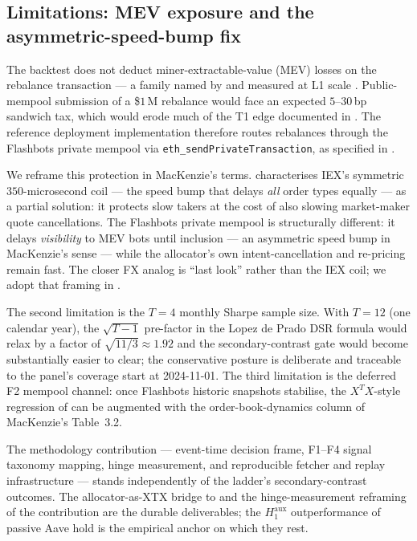 \subsection{Limitations: MEV exposure and the asymmetric-speed-bump fix}
\label{sec:disc-limits}

The backtest does not deduct miner-extractable-value (MEV) losses
on the rebalance transaction --- a family named by
\cite{daian2020flashboys} and measured at L1 scale
\cite{heimbach2023pbs, capponi2025mev}.
Public-mempool submission of a \$$1$\,M rebalance would face an
expected $5$--$30$\,bp sandwich tax, which would erode much of the
T1 edge documented in
.  The reference deployment implementation
therefore routes rebalances through the Flashbots private mempool via
\texttt{eth\_sendPrivateTransaction}, as specified in
.

We reframe this protection in MacKenzie's terms.
\cite[pp.\,200--203]{mackenzie2021} characterises IEX's symmetric
$350$-microsecond coil --- the speed bump that delays \emph{all}
order types equally --- as a partial solution: it protects slow
takers at the cost of also slowing market-maker quote
cancellations.  The Flashbots private mempool is structurally
different: it delays \emph{visibility} to MEV bots until
inclusion --- an asymmetric speed bump in MacKenzie's sense ---
while the allocator's own intent-cancellation and re-pricing
remain fast.  The closer FX analog is ``last look'' rather than
the IEX coil; we adopt that framing in
.

The second limitation is the $T = 4$ monthly Sharpe sample size.
With $T = 12$ (one calendar year), the $\sqrt{T-1}$ pre-factor
in the Lopez de Prado DSR formula
\cite[Ch.\,14.7.3]{lopezdeprado2018} would relax by a factor of
$\sqrt{11/3} \approx 1.92$ and the secondary-contrast gate would
become substantially easier to clear; the conservative posture is
deliberate and traceable to the panel's coverage start at
2024-11-01.  The third limitation is the deferred F2 mempool
channel: once Flashbots historic snapshots stabilise, the
$X^{T} X$-style regression of \cite[p.\,176]{mackenzie2021} can
be augmented with the order-book-dynamics column of MacKenzie's
Table~3.2.

The methodology contribution --- event-time decision frame,
F1--F4 signal taxonomy mapping, hinge measurement, and
reproducible fetcher and replay infrastructure --- stands independently
of the ladder's secondary-contrast outcomes.  The
allocator-as-XTX bridge to \cite{mackenzie2021} and the
hinge-measurement reframing of the contribution are the durable
deliverables; the $H_{1}^{\text{aux}}$ outperformance of passive
Aave hold is the empirical anchor on which they rest.

